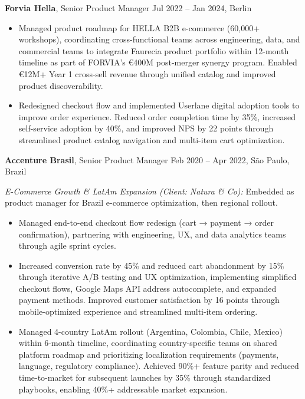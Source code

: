 \documentclass[11pt,a4paper]{article}
\begin{document}
\vspace{6pt}

\noindent\textbf{Forvia Hella}, Senior Product Manager \hfill Jul 2022 – Jan 2024, Berlin
\begin{itemize}[leftmargin=*, label=$\bullet$, itemsep=5pt, parsep=0pt]
\item Managed product roadmap for HELLA B2B e-commerce (60,000+ workshops), coordinating cross-functional teams across engineering, data, and commercial teams to integrate Faurecia product portfolio within 12-month timeline as part of FORVIA's €400M post-merger synergy program. Enabled €12M+ Year 1 cross-sell revenue through unified catalog and improved product discoverability.

\item Redesigned checkout flow and implemented Userlane digital adoption tools to improve order experience. Reduced order completion time by 35\%, increased self-service adoption by 40\%, and improved NPS by 22 points through streamlined product catalog navigation and multi-item cart optimization.
\end{itemize}

\vspace{6pt}

\noindent\textbf{Accenture Brasil}, Senior Product Manager \hfill Feb 2020 – Apr 2022, São Paulo, Brazil

\vspace{6pt}

\noindent\textit{E-Commerce Growth \& LatAm Expansion (Client: Natura \& Co):} Embedded as product manager for Brazil e-commerce optimization, then regional rollout.


\begin{itemize}[leftmargin=*, label=$\bullet$, itemsep=2pt, parsep=0pt]
\item Managed end-to-end checkout flow redesign (cart → payment → order confirmation), partnering with engineering, UX, and data analytics teams through agile sprint cycles.

\item Increased conversion rate by 45\% and reduced cart abandonment by 15\% through iterative A/B testing and UX optimization, implementing simplified checkout flows, Google Maps API address autocomplete, and expanded payment methods. Improved customer satisfaction by 16 points through mobile-optimized experience and streamlined multi-item ordering.

\item Managed 4-country LatAm rollout (Argentina, Colombia, Chile, Mexico) within 6-month timeline, coordinating country-specific teams on shared platform roadmap and prioritizing localization requirements (payments, language, regulatory compliance). Achieved 90\%+ feature parity and reduced time-to-market for subsequent launches by 35\% through standardized playbooks, enabling 40\%+ addressable market expansion.
\end{itemize}
\end{document}
